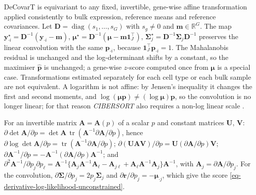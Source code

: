 \begin{remark}
  \label{pr:decovart-affine-equivariance}
  DeCovarT is equivariant to any fixed, invertible, gene-wise affine transformation applied
  consistently to bulk expression, reference means and reference covariances.
  Let \(\boldsymbol{D}=\operatorname{diag}(s_{1},\ldots,s_{G})\) with \(s_{g}\neq0\) and \(\boldsymbol{m}\in\mathbb{R}^{G}\).
  The map
  \(\boldsymbol{y}^{\star}_{\cdot i}=\boldsymbol{D}^{-1}(\boldsymbol{y}_{\cdot i}-\boldsymbol{m})\),
  \(\boldsymbol{\mu}^{\star}=\boldsymbol{D}^{-1}(\boldsymbol{\mu}-\boldsymbol{m}\mathbf{1}_{J}^{\top})\),
  \(\boldsymbol{\Sigma}_{j}^{\star}=\boldsymbol{D}^{-1}\boldsymbol{\Sigma}_{j}\boldsymbol{D}^{-1}\)
  preserves the linear convolution with the same \(\boldsymbol{p}_{\cdot i}\), because
  \(\mathbf{1}_{J}^{\top}\boldsymbol{p}_{\cdot i}=1\).
  The Mahalanobis residual is unchanged and the log-determinant shifts by a constant, so the
  maximiser \(\hat{\boldsymbol{p}}\) is unchanged; a gene-wise \(z\)-score computed once from \(\boldsymbol{\mu}\) is a special
  case.
  Transformations estimated separately for each cell type or each bulk sample are not
  equivalent.
  A logarithm is not affine: by Jensen's inequality it changes the first and second moments, and
  \(\log(\boldsymbol{\mu}\boldsymbol{p})\neq(\log\boldsymbol{\mu})\boldsymbol{p}\), so the convolution is no longer linear; for that
  reason \emph{CIBERSORT} also requires a non-log linear scale \cite{newmanRobustEnumerationCell2015}.
\end{remark}

\begin{remark}
  \label{pr:matrix-calculus}
  For an invertible matrix \(\boldsymbol{A}=\boldsymbol{A}(p)\) of a scalar \(p\) and constant matrices \(\boldsymbol{U}\),
  \(\boldsymbol{V}\):
  \(\partial\det\boldsymbol{A}/\partial p=\det\boldsymbol{A}\,\operatorname{tr}(\boldsymbol{A}^{-1}\partial\boldsymbol{A}/\partial p)\), hence
  \(\partial\log\det\boldsymbol{A}/\partial p=\operatorname{tr}(\boldsymbol{A}^{-1}\partial\boldsymbol{A}/\partial p)\);
  \(\partial(\boldsymbol{U}\boldsymbol{A}\boldsymbol{V})/\partial p=\boldsymbol{U}(\partial\boldsymbol{A}/\partial p)\boldsymbol{V}\);
  \(\partial\boldsymbol{A}^{-1}/\partial p=-\boldsymbol{A}^{-1}(\partial\boldsymbol{A}/\partial p)\boldsymbol{A}^{-1}\);
  and \(\partial^{2}\boldsymbol{A}^{-1}/\partial p_{j}\partial p_{\ell}
  =\boldsymbol{A}^{-1}\{\boldsymbol{A}_{j}\boldsymbol{A}^{-1}\boldsymbol{A}_{\ell}-\boldsymbol{A}_{j\ell}+\boldsymbol{A}_{\ell}\boldsymbol{A}^{-1}\boldsymbol{A}_{j}\}\boldsymbol{A}^{-1}\),
  with \(\boldsymbol{A}_{j}=\partial\boldsymbol{A}/\partial p_{j}\).
  For the convolution, \(\partial\boldsymbol{\Sigma}/\partial p_{j}=2p_{j}\boldsymbol{\Sigma}_{j}\) and
  \(\partial\boldsymbol{r}/\partial p_{j}=-\boldsymbol{\mu}_{\cdot j}\), which give the score
  \eqref{eq-derivative-log-likelihood-unconstrained}.
\end{remark}

